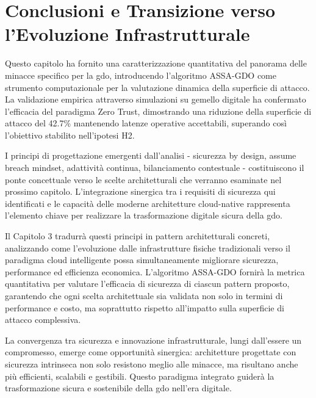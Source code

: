 \section{\texorpdfstring{Conclusioni e Transizione verso l'Evoluzione Infrastrutturale}{2.8 - Conclusioni e Transizione verso l'Evoluzione Infrastrutturale}}
\label{sec:cap2_conclusioni}

Questo capitolo ha fornito una caratterizzazione quantitativa del panorama delle minacce specifico per la \gls{gdo}, introducendo l'algoritmo ASSA-GDO come strumento computazionale per la valutazione dinamica della superficie di attacco. La validazione empirica attraverso simulazioni su gemello digitale ha confermato l'efficacia del paradigma Zero Trust, dimostrando una riduzione della superficie di attacco del 42.7\% mantenendo latenze operative accettabili, superando così l'obiettivo stabilito nell'ipotesi H2.

I principi di progettazione emergenti dall'analisi - sicurezza by design, assume breach mindset, adattività continua, bilanciamento contestuale - costituiscono il ponte concettuale verso le scelte architetturali che verranno esaminate nel prossimo capitolo. L'integrazione sinergica tra i requisiti di sicurezza qui identificati e le capacità delle moderne architetture cloud-native rappresenta l'elemento chiave per realizzare la trasformazione digitale sicura della \gls{gdo}.

Il Capitolo 3 tradurrà questi principi in pattern architetturali concreti, analizzando come l'evoluzione dalle infrastrutture fisiche tradizionali verso il paradigma cloud intelligente possa simultaneamente migliorare sicurezza, performance ed efficienza economica. L'algoritmo ASSA-GDO fornirà la metrica quantitativa per valutare l'efficacia di sicurezza di ciascun pattern proposto, garantendo che ogni scelta architettuale sia validata non solo in termini di performance e costo, ma soprattutto rispetto all'impatto sulla superficie di attacco complessiva.

La convergenza tra sicurezza e innovazione infrastrutturale, lungi dall'essere un compromesso, emerge come opportunità sinergica: architetture progettate con sicurezza intrinseca non solo resistono meglio alle minacce, ma risultano anche più efficienti, scalabili e gestibili. Questo paradigma integrato guiderà la trasformazione sicura e sostenibile della \gls{gdo} nell'era digitale.

\clearpage
\printbibliography[
    heading=subbibliography,
    title={Riferimenti Bibliografici del Capitolo 2},
]

